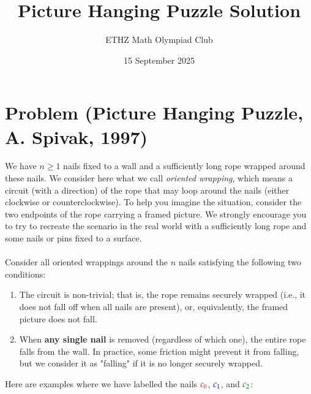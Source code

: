 \documentclass[11pt, a4paper, oneside]{article}
\title{Picture Hanging Puzzle Solution}
\author{ETHZ Math Olympiad Club}
\date{15 September 2025}
\newcommand{\problem}[1][]{\section*{#1} \hfill \par}
\theoremstyle{remark}
\theoremstyle{lemma}
\begin{document}
\maketitle
\problem[Problem (Picture Hanging Puzzle, A. Spivak, 1997)]
We have \(n \geq 1\) nails fixed to a wall and a sufficiently long rope wrapped around these nails. We consider here what we call \textit{oriented wrapping}, which means a circuit (with a direction) of the rope that may loop around the nails (either clockwise or counterclockwise). To help you imagine the situation, consider the two endpoints of the rope carrying a framed picture. We strongly encourage you to try to recreate the scenario in the real world with a sufficiently long rope and some nails or pins fixed to a surface. 
\\\\
Consider all oriented wrappings around the \(n\) nails satisfying the following two conditions:
\begin{enumerate}
    \item The circuit is non-trivial; that is, the rope remains securely wrapped (i.e., it does not fall off when all nails are present), or, equivalently, the framed picture does not fall.
    \item When \textbf{any single nail} is removed (regardless of which one), the entire rope falls from the wall. In practice, some friction might prevent it from falling, but we consider it as "falling" if it is no longer securely wrapped.
\end{enumerate}
Here are examples where we have labelled the nails \(\textcolor{red}{c_0}\), \(\textcolor{blue}{c_1}\), and \(\textcolor{green!50!black}{c_2}\):
\end{document}

